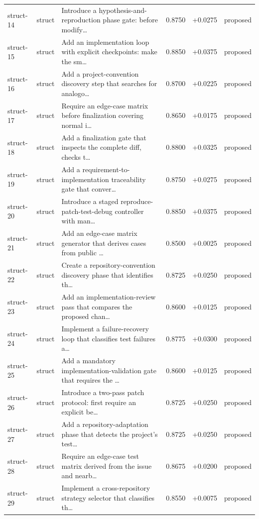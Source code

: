 \begin{center}
\begin{longtable}{llp{5.2cm}rrl}
struct-14 & struct & Introduce a hypothesis-and-reproduction phase gate: before modify\ldots{} & 0.8750 & +0.0275 & proposed \\
struct-15 & struct & Add an implementation loop with explicit checkpoints: make the sm\ldots{} & 0.8850 & +0.0375 & proposed \\
struct-16 & struct & Add a project-convention discovery step that searches for analogo\ldots{} & 0.8700 & +0.0225 & proposed \\
struct-17 & struct & Require an edge-case matrix before finalization covering normal i\ldots{} & 0.8650 & +0.0175 & proposed \\
struct-18 & struct & Add a finalization gate that inspects the complete diff, checks t\ldots{} & 0.8800 & +0.0325 & proposed \\
struct-19 & struct & Add a requirement-to-implementation traceability gate that conver\ldots{} & 0.8750 & +0.0275 & proposed \\
struct-20 & struct & Introduce a staged reproduce-patch-test-debug controller with man\ldots{} & 0.8850 & +0.0375 & proposed \\
struct-21 & struct & Add an edge-case matrix generator that derives cases from public \ldots{} & 0.8500 & +0.0025 & proposed \\
struct-22 & struct & Create a repository-convention discovery phase that identifies th\ldots{} & 0.8725 & +0.0250 & proposed \\
struct-23 & struct & Add an implementation-review pass that compares the proposed chan\ldots{} & 0.8600 & +0.0125 & proposed \\
struct-24 & struct & Implement a failure-recovery loop that classifies test failures a\ldots{} & 0.8775 & +0.0300 & proposed \\
struct-25 & struct & Add a mandatory implementation-validation gate that requires the \ldots{} & 0.8600 & +0.0125 & proposed \\
struct-26 & struct & Introduce a two-pass patch protocol: first require an explicit be\ldots{} & 0.8725 & +0.0250 & proposed \\
struct-27 & struct & Add a repository-adaptation phase that detects the project's test\ldots{} & 0.8725 & +0.0250 & proposed \\
struct-28 & struct & Require an edge-case test matrix derived from the issue and nearb\ldots{} & 0.8675 & +0.0200 & proposed \\
struct-29 & struct & Implement a cross-repository strategy selector that classifies th\ldots{} & 0.8550 & +0.0075 & proposed \\

\end{longtable}
\end{center}
